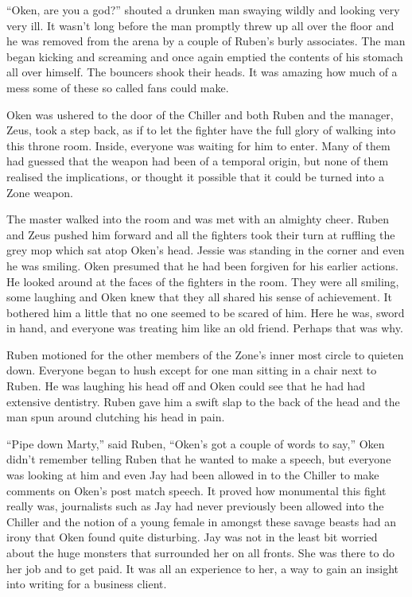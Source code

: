 ``Oken, are you a god?'' shouted a drunken man swaying wildly and looking very very ill. It wasn't long before the man promptly threw up all over the floor and he was removed from the arena by a couple of Ruben's burly associates. The man began kicking and screaming and once again emptied the contents of his stomach all over himself. The bouncers shook their heads. It was amazing how much of a mess some of these so called fans could make.

Oken was ushered to the door of the Chiller and both Ruben and the manager, Zeus, took a step back, as if to let the fighter have the full glory of walking into this throne room. Inside, everyone was waiting for him to enter. Many of them had guessed that the weapon had been of a temporal origin, but none of them realised the implications, or thought it possible that it could be turned into a Zone weapon.

The master walked into the room and was met with an almighty cheer. Ruben and Zeus pushed him forward and all the fighters took their turn at ruffling the grey mop which sat atop Oken's head. Jessie was standing in the corner and even he was smiling. Oken presumed that he had been forgiven for his earlier actions. He looked around at the faces of the fighters in the room. They were all smiling, some laughing and Oken knew that they all shared his sense of achievement. It bothered him a little that no one seemed to be scared of him. Here he was, sword in hand, and everyone was treating him like an old friend. Perhaps that was why.

Ruben motioned for the other members of the Zone's inner most circle to quieten down. Everyone began to hush except for one man sitting in a chair next to Ruben. He was laughing his head off and Oken could see that he had had extensive dentistry. Ruben gave him a swift slap to the back of the head and the man spun around clutching his head in pain.

``Pipe down Marty,'' said Ruben, ``Oken's got a couple of words to say,'' Oken didn't remember telling Ruben that he wanted to make a speech, but everyone was looking at him and even Jay had been allowed in to the Chiller to make comments on Oken's post match speech. It proved how monumental this fight really was, journalists such as Jay had never previously been allowed into the Chiller and the notion of a young female in amongst these savage beasts had an irony that Oken found quite disturbing. Jay was not in the least bit worried about the huge monsters that surrounded her on all fronts. She was there to do her job and to get paid. It was all an experience to her, a way to gain an insight into writing for a business client.

